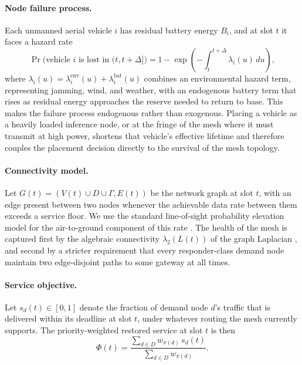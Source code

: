 \documentclass[drones,article,submit,moreauthors]{Definitions/mdpi}
\begin{document}
\paragraph{Node failure process.} Each unmanned aerial vehicle $i$ has residual battery energy $B_i$, and at slot $t$ it faces a hazard rate
\begin{equation}
\Pr\big(\text{vehicle } i \text{ is lost in } (t, t+\Delta]\big) = 1 - \exp\left(-\int_t^{t+\Delta} \lambda_i(u)\, du\right),
\end{equation}
where $\lambda_i(u) = \lambda_i^{\mathrm{env}}(u) + \lambda_i^{\mathrm{bat}}(u)$ combines an environmental hazard term, representing jamming, wind, and weather, with an endogenous battery term that rises as residual energy approaches the reserve needed to return to base. This makes the failure process endogenous rather than exogenous. Placing a vehicle as a heavily loaded inference node, or at the fringe of the mesh where it must transmit at high power, shortens that vehicle's effective lifetime and therefore couples the placement decision directly to the survival of the mesh topology.

\paragraph{Connectivity model.} Let $G(t) = (V(t) \cup D \cup \Gamma, E(t))$ be the network graph at slot $t$, with an edge present between two nodes whenever the achievable data rate between them exceeds a service floor. We use the standard line-of-sight probability elevation model for the air-to-ground component of this rate \cite{alhourani2014optimal,mozaffari2019tutorial}. The health of the mesh is captured first by the algebraic connectivity $\lambda_2(L(t))$ of the graph Laplacian \cite{fiedler1973algebraic}, and second by a stricter requirement that every responder-class demand node maintain two edge-disjoint paths to some gateway at all times.

\paragraph{Service objective.} Let $s_d(t) \in [0, 1]$ denote the fraction of demand node $d$'s traffic that is delivered within its deadline at slot $t$, under whatever routing the mesh currently supports. The priority-weighted restored service at slot $t$ is then
\begin{equation}
\Phi(t) = \frac{\sum_{d \in D} w_{\pi(d)}\, s_d(t)}{\sum_{d \in D} w_{\pi(d)}}.
\end{equation}
\end{document}
